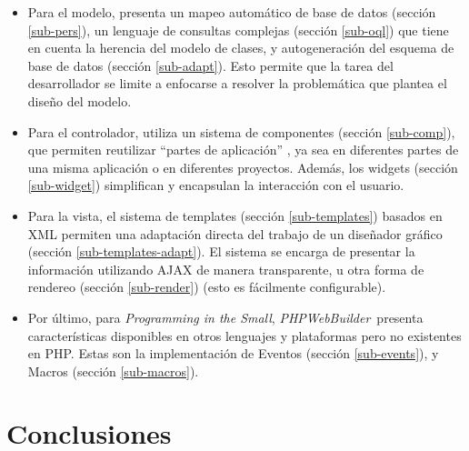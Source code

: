 \documentclass[a4paper,10pt]{article}
\newcommand{\PITS}{\emph{Programming in the Small}} %
\newcommand{\PWB}{\emph{PHPWebBuilder}}
\begin{document}
\begin{itemize}
\item Para el modelo, presenta un mapeo automático de base de datos (sección \ref{sub-pers}), un lenguaje de consultas complejas (sección \ref{sub-oql}) que tiene en cuenta la herencia del modelo de clases, y autogeneración del esquema de base de datos (sección \ref{sub-adapt}). Esto permite que la tarea del desarrollador se limite a enfocarse a resolver la problemática que plantea el diseño del modelo.

\item Para el controlador, utiliza un sistema de componentes (sección \ref{sub-comp}), que permiten reutilizar ``partes de aplicación'' , ya sea en diferentes partes de una misma aplicación o en diferentes proyectos. Además, los widgets (sección \ref{sub-widget}) simplifican y encapsulan la interacción con el usuario.

\item Para la vista, el sistema de templates (sección \ref{sub-templates}) basados en XML permiten una adaptación directa del trabajo de un diseñador gráfico (sección \ref{sub-templates-adapt}). El sistema se encarga de presentar la información utilizando AJAX de manera transparente, u otra forma de rendereo (sección \ref{sub-render}) (esto es fácilmente configurable).

\item Por último, para \PITS, \PWB \ presenta características disponibles en otros lenguajes y plataformas pero no existentes en PHP. Estas son la implementación de Eventos (sección \ref{sub-events}),
y Macros (sección \ref{sub-macros}).

\end{itemize}


%




\section{Conclusiones}
\end{document}
